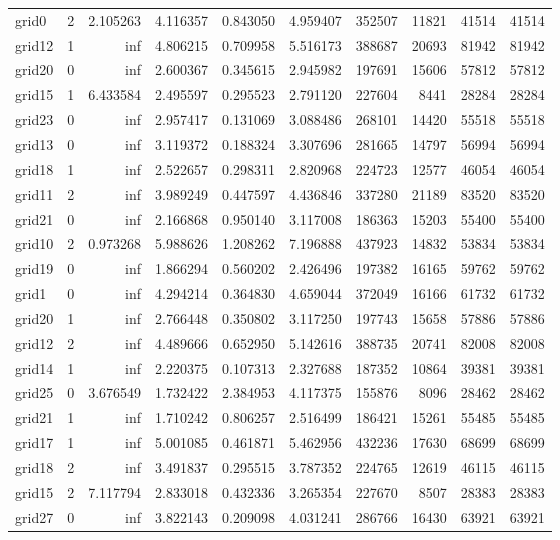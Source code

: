 \begin{longtable}{|l|r|r|r|r|r|r|r|r|r|}
grid0 & 2 & 2.105263 & 4.116357 & 0.843050 & 4.959407 & 352507 & 11821 & 41514 & 41514 \\
grid12 & 1 & inf & 4.806215 & 0.709958 & 5.516173 & 388687 & 20693 & 81942 & 81942 \\
grid20 & 0 & inf & 2.600367 & 0.345615 & 2.945982 & 197691 & 15606 & 57812 & 57812 \\
grid15 & 1 & 6.433584 & 2.495597 & 0.295523 & 2.791120 & 227604 & 8441 & 28284 & 28284 \\
grid23 & 0 & inf & 2.957417 & 0.131069 & 3.088486 & 268101 & 14420 & 55518 & 55518 \\
grid13 & 0 & inf & 3.119372 & 0.188324 & 3.307696 & 281665 & 14797 & 56994 & 56994 \\
grid18 & 1 & inf & 2.522657 & 0.298311 & 2.820968 & 224723 & 12577 & 46054 & 46054 \\
grid11 & 2 & inf & 3.989249 & 0.447597 & 4.436846 & 337280 & 21189 & 83520 & 83520 \\
grid21 & 0 & inf & 2.166868 & 0.950140 & 3.117008 & 186363 & 15203 & 55400 & 55400 \\
grid10 & 2 & 0.973268 & 5.988626 & 1.208262 & 7.196888 & 437923 & 14832 & 53834 & 53834 \\
grid19 & 0 & inf & 1.866294 & 0.560202 & 2.426496 & 197382 & 16165 & 59762 & 59762 \\
grid1 & 0 & inf & 4.294214 & 0.364830 & 4.659044 & 372049 & 16166 & 61732 & 61732 \\
grid20 & 1 & inf & 2.766448 & 0.350802 & 3.117250 & 197743 & 15658 & 57886 & 57886 \\
grid12 & 2 & inf & 4.489666 & 0.652950 & 5.142616 & 388735 & 20741 & 82008 & 82008 \\
grid14 & 1 & inf & 2.220375 & 0.107313 & 2.327688 & 187352 & 10864 & 39381 & 39381 \\
grid25 & 0 & 3.676549 & 1.732422 & 2.384953 & 4.117375 & 155876 & 8096 & 28462 & 28462 \\
grid21 & 1 & inf & 1.710242 & 0.806257 & 2.516499 & 186421 & 15261 & 55485 & 55485 \\
grid17 & 1 & inf & 5.001085 & 0.461871 & 5.462956 & 432236 & 17630 & 68699 & 68699 \\
grid18 & 2 & inf & 3.491837 & 0.295515 & 3.787352 & 224765 & 12619 & 46115 & 46115 \\
grid15 & 2 & 7.117794 & 2.833018 & 0.432336 & 3.265354 & 227670 & 8507 & 28383 & 28383 \\
grid27 & 0 & inf & 3.822143 & 0.209098 & 4.031241 & 286766 & 16430 & 63921 & 63921 \\

\end{longtable}
